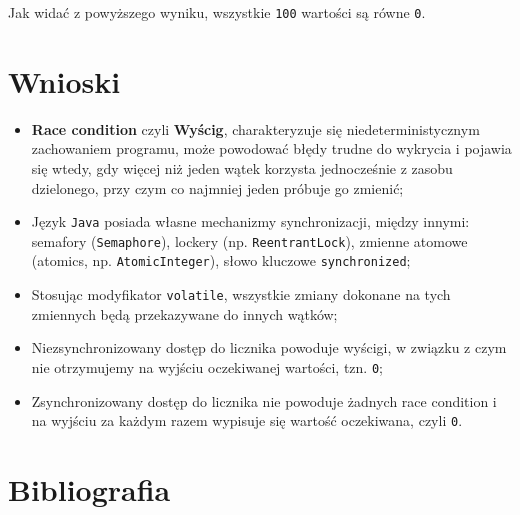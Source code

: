 \documentclass[11pt]{article}
\begin{document}
    Jak widać z powyższego wyniku, wszystkie \texttt{100} wartości są równe
\texttt{0}.

    \hypertarget{wnioski}{%
\section{Wnioski}\label{wnioski}}

\begin{itemize}
\item
  \textbf{Race condition} czyli \textbf{Wyścig}, charakteryzuje się
  niedeterministycznym zachowaniem programu, może powodować błędy trudne
  do wykrycia i pojawia się wtedy, gdy więcej niż jeden wątek korzysta
  jednocześnie z zasobu dzielonego, przy czym co najmniej jeden próbuje
  go zmienić;
\item
  Język \texttt{Java} posiada własne mechanizmy synchronizacji, między
  innymi: semafory (\texttt{Semaphore}), lockery (np.
  \texttt{ReentrantLock}), zmienne atomowe (atomics, np.
  \texttt{AtomicInteger}), słowo kluczowe \texttt{synchronized};
\item
  Stosując modyfikator \texttt{volatile}, wszystkie zmiany dokonane na
  tych zmiennych będą przekazywane do innych wątków;
\item
  Niezsynchronizowany dostęp do licznika powoduje wyścigi, w związku z
  czym nie otrzymujemy na wyjściu oczekiwanej wartości, tzn. \texttt{0};
\item
  Zsynchronizowany dostęp do licznika nie powoduje żadnych race
  condition i na wyjściu za każdym razem wypisuje się wartość
  oczekiwana, czyli \texttt{0}.
\end{itemize}

    \hypertarget{bibliografia}{%
\section{Bibliografia}\label{bibliografia}}
\end{document}
